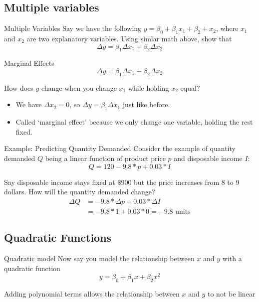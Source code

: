 \documentclass[aspectratio=169,t,11pt,table]{beamer}
\begin{document}
\subsection*{Multiple variables}

\begin{frame}{Multiple Variables}
  Say we have the following $y = \beta_0 + \beta_1 x_1 + \beta_2 + x_2$, where $x_1$ and $x_2$ are two explanatory variables. Using simlar math above, show that 
  $$
    \Delta y = \beta_1 \Delta x_1 + \beta_2 \Delta x_2
  $$
\end{frame}

\begin{frame}{Marginal Effects}
  \vspace*{-2\bigskipamount}
  $$
    \Delta y = \beta_1 \Delta x_1 + \beta_2 \Delta x_2
  $$

  How does $y$ change when you change $x_1$ while holding $x_2$ equal?
  \begin{itemize}
    \item We have $\Delta x_2 = 0$, so $\Delta y = \beta_1 \Delta x_1$ just like before. 

    \item Called `marginal effect' because we only change one variable, holding the rest fixed.
  \end{itemize}
\end{frame}

\begin{frame}{Example: Predicting Quantity Demanded}
  Consider the example of quantity demanded $Q$ being a linear function of product price $p$ and disposable income $I$:
  $$
    Q = 120 - 9.8 * p + 0.03 * I
  $$

  Say disposable income stays fixed at $\$900$ but the price increases from 8 to 9 dollars. How will the quantity demanded change?
  \pause
  \begin{align*}
    \Delta Q 
    &= -9.8 * \Delta p + 0.03 * \Delta I \\
    &= -9.8 * 1 + 0.03 * 0 = -9.8 \text{ units}
  \end{align*}
\end{frame}


\subsection*{Quadratic Functions}

\begin{frame}{Quadratic model}
  Now say you model the relationship between $x$ and $y$ with a quadratic function
  $$
    y = \beta_0 + \beta_1 x + \beta_2 x^2
  $$

  \bigskip
  Adding polynomial terms allows the relationship between $x$ and $y$ to not be linear 
\end{frame}
\end{document}
